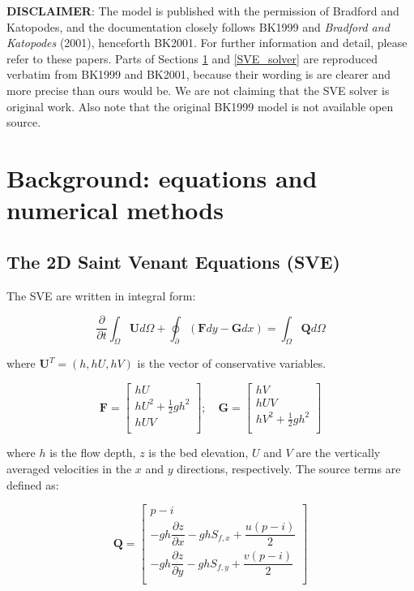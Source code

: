 \documentclass{article}
\begin{document}
\textbf{DISCLAIMER}:
The model is published with the permission of Bradford and Katopodes, and the documentation closely follows BK1999 and  \textit{Bradford and Katopodes} (2001), henceforth BK2001. For further information and detail, please refer to these papers.  Parts of Sections \ref{SVE} and \ref{SVE_solver} are reproduced verbatim from BK1999 and BK2001, because their wording is are clearer and more precise than ours would be.  We are not claiming that the SVE solver is original work.  Also note that the original BK1999 model is not available open source.
  
\section{Background: equations and numerical methods }
\label{SVE}

\subsection{The 2D Saint Venant Equations (SVE)}
The SVE are written in integral form:

\begin{equation}
	\dfrac{\partial}{\partial t} \int_\Omega \mathbf{U} d\Omega + \oint_\partial (\mathbf{F} dy - \mathbf{G} dx ) = \int_\Omega \mathbf{Q} d\Omega
\end{equation}

where $\mathbf{U}^T = (h, hU, hV) $ is the vector of conservative variables. 


\[ \mathbf{F} = 
\begin{bmatrix}
	h U  \\
	h U^2 + \frac{1}{2} g h^2 \\
	h U V \\
\end{bmatrix}  ; \quad
\mathbf{G} = 
\begin{bmatrix}
	h V \\
	h U V \\
	h V^2 + \frac{1}{2} g h^2 \\	
\end{bmatrix}  
\]

where $h$ is the flow depth,  $z$ is the bed elevation, $U$ and $V$ are the vertically averaged velocities in the $x$ and $y$ directions, respectively. 
The source terms are defined as:


 \[ \mathbf{Q} = 
 \begin{bmatrix}
	p - i  \\[.1cm]
	- g h \dfrac{\partial z}{\partial x} - g h  S_{f,x} + \dfrac{u(p-i)}{2}\\[.15cm]
	- g h \dfrac{\partial z}{\partial y} - g h  S_{f,y} + \dfrac{v(p-i)}{2}\\[.15cm]
\end{bmatrix} 
\]
\end{document}
